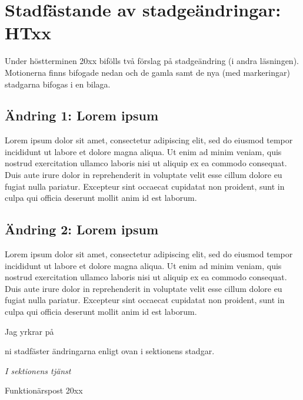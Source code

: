 \documentclass[10pt]{article}
\def\docauthor{Förnamn efternamn}
\begin{document}
    \newpage

    \section*{Stadfästande av stadgeändringar: HTxx}
    Under höstterminen 20xx bifölls två förslag på stadgeändring (i andra läsningen). Motionerna finns bifogade nedan och de gamla samt de nya (med markeringar) stadgarna bifogas i en bilaga.

    \subsection*{Ändring 1: Lorem ipsum}
    Lorem ipsum dolor sit amet, consectetur adipiscing elit, sed do eiusmod tempor incididunt ut labore et dolore magna aliqua. Ut enim ad minim veniam, quis nostrud exercitation ullamco laboris nisi ut aliquip ex ea commodo consequat. Duis aute irure dolor in reprehenderit in voluptate velit esse cillum dolore eu fugiat nulla pariatur. Excepteur sint occaecat cupidatat non proident, sunt in culpa qui officia deserunt mollit anim id est laborum.

    \subsection*{Ändring 2: Lorem ipsum}
    Lorem ipsum dolor sit amet, consectetur adipiscing elit, sed do eiusmod tempor incididunt ut labore et dolore magna aliqua. Ut enim ad minim veniam, quis nostrud exercitation ullamco laboris nisi ut aliquip ex ea commodo consequat. Duis aute irure dolor in reprehenderit in voluptate velit esse cillum dolore eu fugiat nulla pariatur. Excepteur sint occaecat cupidatat non proident, sunt in culpa qui officia deserunt mollit anim id est laborum.

    Jag yrkrar på
    \begin{attlist}
        \item ni stadfäster ändringarna enligt ovan i sektionens stadgar.
    \end{attlist}

\begin{signatures}{1}
    \emph{I sektionens tjänst}
    \signature{\docauthor}{Funktionärspost 20xx}
\end{signatures}
\end{document}
